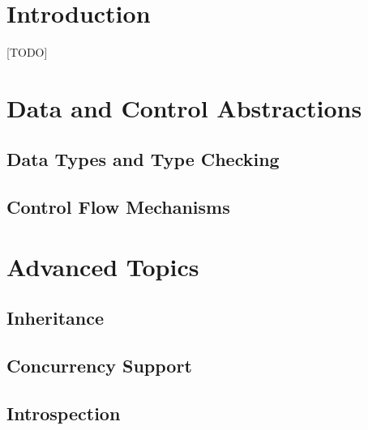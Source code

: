 \documentclass[12pt]{article}
\begin{document}
\maketitle

\section{Introduction}
[TODO]~\cite{learnyouahaskell}


\section{Data and Control Abstractions}


\subsection{Data Types and Type Checking}
\subsection{Control Flow Mechanisms}


\section{Advanced Topics}

\subsection{Inheritance}
\subsection{Concurrency Support}
\subsection{Introspection}



\end{document}
